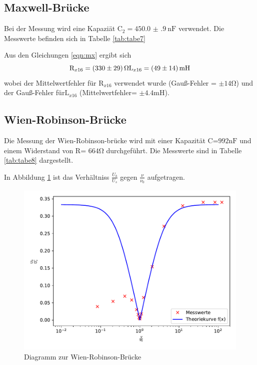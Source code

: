 \subsection{Maxwell-Brücke}

Bei der Messung wird eine Kapaziät $ \text{C}_{2} = \SI{450.0(9)}{\nano\farad} $
verwendet. Die Messwerte befinden sich in Tabelle \ref{tab:tabe7}

Aus den Gleichungen \ref{eqn:mx}
ergibt sich\begin{equation*}
  \text{R}_{x16} = \SI{330 (29)}{\ohm} \\
  \text{L}_{x16} = \SI{49 (14)}{\milli\henry}
\end{equation*}
wobei der Mittelwertfehler für $ \text{R}_{x16} $ verwendet wurde (Gauß-Fehler =
$ \pm 14 \si{\ohm} $) und der Gauß-Fehler für$ \text{L}_{x16} $ (Mittelwertfehler=
$ \pm 4.4 \si{\milli\henry} $).

\subsection{Wien-Robinson-Brücke}
Die Messung der Wien-Robinson-brücke wird mit einer Kapazität C=$ 992\si{\nano\farad}$
und einem Widerstand von R= $664\si{\ohm}$ durchgeführt. Die Messwerte sind in Tabelle
\ref{tab:tabe8} dargestellt.

\noindent In Abbildung \ref{fig:plot} ist das Verhältniss $\frac{U_b}{U_s}$ gegen
$\frac{\nu}{\nu_0} $ aufgetragen.

\begin{figure}[H]
  \centering
  \includegraphics{plot.pdf}
  \caption{Diagramm zur Wien-Robinson-Brücke}
  \label{fig:plot}
\end{figure}

